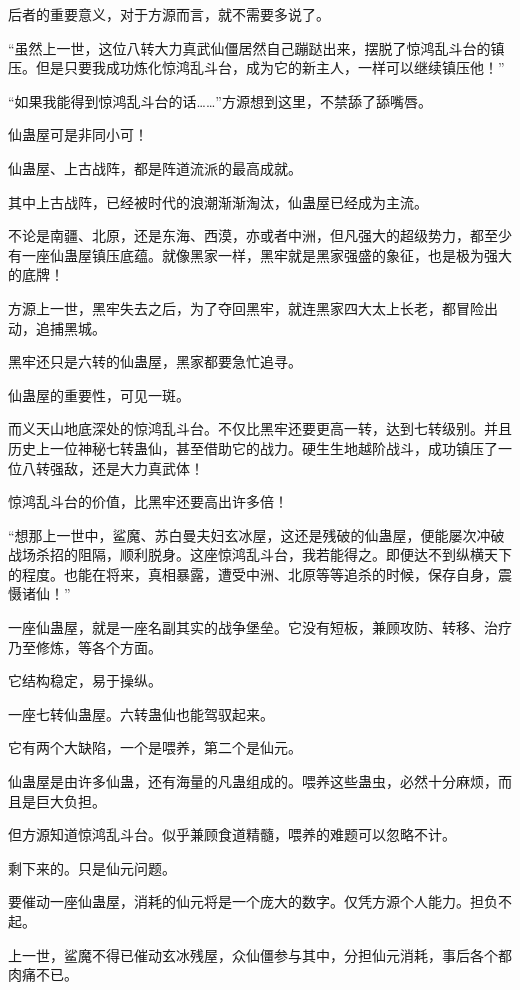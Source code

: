 \begin{this_body}
后者的重要意义，对于方源而言，就不需要多说了。

“虽然上一世，这位八转大力真武仙僵居然自己蹦跶出来，摆脱了惊鸿乱斗台的镇压。但是只要我成功炼化惊鸿乱斗台，成为它的新主人，一样可以继续镇压他！”

“如果我能得到惊鸿乱斗台的话……”方源想到这里，不禁舔了舔嘴唇。

仙蛊屋可是非同小可！

仙蛊屋、上古战阵，都是阵道流派的最高成就。

其中上古战阵，已经被时代的浪潮渐渐淘汰，仙蛊屋已经成为主流。

不论是南疆、北原，还是东海、西漠，亦或者中洲，但凡强大的超级势力，都至少有一座仙蛊屋镇压底蕴。就像黑家一样，黑牢就是黑家强盛的象征，也是极为强大的底牌！

方源上一世，黑牢失去之后，为了夺回黑牢，就连黑家四大太上长老，都冒险出动，追捕黑城。

黑牢还只是六转的仙蛊屋，黑家都要急忙追寻。

仙蛊屋的重要性，可见一斑。

而义天山地底深处的惊鸿乱斗台。不仅比黑牢还要更高一转，达到七转级别。并且历史上一位神秘七转蛊仙，甚至借助它的战力。硬生生地越阶战斗，成功镇压了一位八转强敌，还是大力真武体！

惊鸿乱斗台的价值，比黑牢还要高出许多倍！

“想那上一世中，鲨魔、苏白曼夫妇玄冰屋，这还是残破的仙蛊屋，便能屡次冲破战场杀招的阻隔，顺利脱身。这座惊鸿乱斗台，我若能得之。即便达不到纵横天下的程度。也能在将来，真相暴露，遭受中洲、北原等等追杀的时候，保存自身，震慑诸仙！”

一座仙蛊屋，就是一座名副其实的战争堡垒。它没有短板，兼顾攻防、转移、治疗乃至修炼，等各个方面。

它结构稳定，易于操纵。

一座七转仙蛊屋。六转蛊仙也能驾驭起来。

它有两个大缺陷，一个是喂养，第二个是仙元。

仙蛊屋是由许多仙蛊，还有海量的凡蛊组成的。喂养这些蛊虫，必然十分麻烦，而且是巨大负担。

但方源知道惊鸿乱斗台。似乎兼顾食道精髓，喂养的难题可以忽略不计。

剩下来的。只是仙元问题。

要催动一座仙蛊屋，消耗的仙元将是一个庞大的数字。仅凭方源个人能力。担负不起。

上一世，鲨魔不得已催动玄冰残屋，众仙僵参与其中，分担仙元消耗，事后各个都肉痛不已。


\end{this_body}
